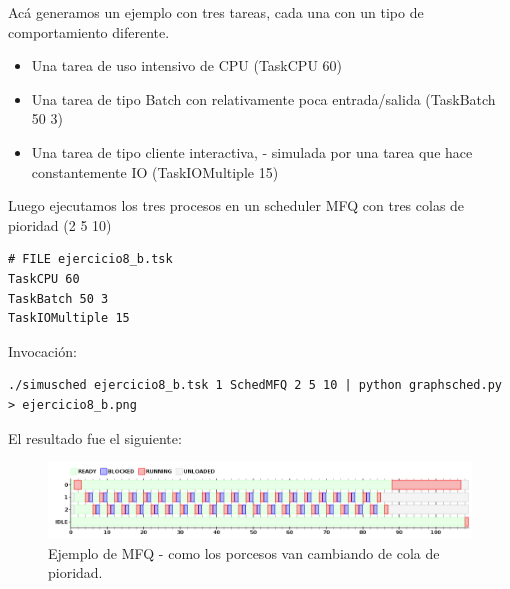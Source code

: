 Ac\'a generamos un ejemplo con tres tareas, cada una con un tipo de comportamiento diferente.

\begin{itemize}
 \item Una tarea de uso intensivo de CPU (TaskCPU 60)
 \item Una tarea de tipo Batch con relativamente poca entrada/salida (TaskBatch 50 3)
 \item Una tarea de tipo cliente interactiva, - simulada por una tarea que hace constantemente IO (TaskIOMultiple 15)
\end{itemize}

Luego ejecutamos los tres procesos en un scheduler MFQ con tres colas de pioridad (2 5 10)

\begin{framed}
\begin{verbatim}
# FILE ejercicio8_b.tsk
TaskCPU 60
TaskBatch 50 3
TaskIOMultiple 15
\end{verbatim}
\end{framed}

Invocaci\'on:

\begin{framed}
\begin{verbatim}
./simusched ejercicio8_b.tsk 1 SchedMFQ 2 5 10 | python graphsched.py > ejercicio8_b.png
\end{verbatim}
\end{framed}

El resultado fue el siguiente:

\begin{figure}[h!]
  \caption{Ejemplo de MFQ - como los porcesos van cambiando de cola de pioridad.}
  \centering
    \includegraphics[width=1\textwidth]{img/ejercicio8_a.png}
\end{figure}

